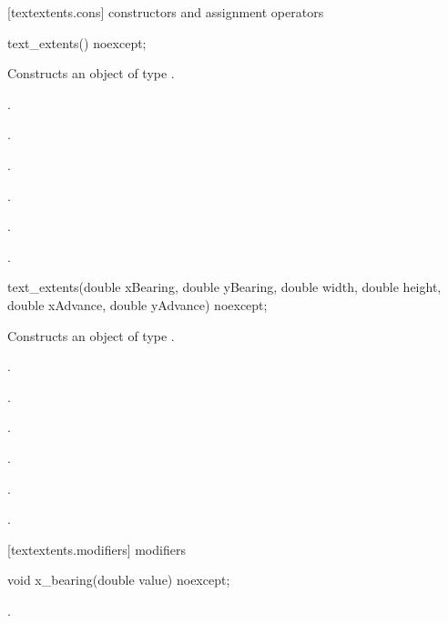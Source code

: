  [textextents.cons] { constructors and assignment operators}

\begin{itemdecl}
    text_extents() noexcept;
\end{itemdecl}
\begin{itemdescr}
	\pnum
	\effects
	Constructs an object of type .
	
	\pnum
	\postconditions
    .
    
    .
    
    .
    
    .
    
    .
    
    .

\end{itemdescr}

\begin{itemdecl}
    text_extents(double xBearing, double yBearing, double width,
      double height, double xAdvance, double yAdvance) noexcept;
\end{itemdecl}
\begin{itemdescr}
	\pnum
	\effects
	Constructs an object of type .
	
	\pnum
	\postconditions
    .
    
    .
    
    .
    
    .
    
    .
    
    .

\end{itemdescr}

 [textextents.modifiers]{ modifiers}

\begin{itemdecl}
    void x_bearing(double value) noexcept;
\end{itemdecl}
\begin{itemdescr}
	\pnum
	\postconditions
	.
\end{itemdescr}

